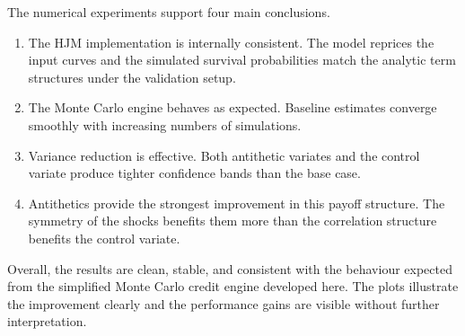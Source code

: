The numerical experiments support four main conclusions.

\begin{enumerate}
    \item The HJM implementation is internally consistent. The model reprices the input curves and the simulated survival probabilities match the analytic term structures under the validation setup.
    \item The Monte Carlo engine behaves as expected. Baseline estimates converge smoothly with increasing numbers of simulations.
    \item Variance reduction is effective. Both antithetic variates and the control variate produce tighter confidence bands than the base case.
    \item Antithetics provide the strongest improvement in this payoff structure. The symmetry of the shocks benefits them more than the correlation structure benefits the control variate.
\end{enumerate}

Overall, the results are clean, stable, and consistent with the behaviour expected from the simplified Monte Carlo credit engine developed here. The plots illustrate the improvement clearly and the performance gains are visible without further interpretation.
